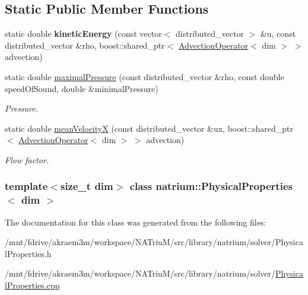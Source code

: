 \subsection*{Static Public Member Functions}
\begin{DoxyCompactItemize}
\item 
\hypertarget{classnatrium_1_1PhysicalProperties_a153e1a29848b78871687c2399f6a12f0}{
static double {\bfseries kineticEnergy} (const vector$<$ distributed\_\-vector $>$ \&u, const distributed\_\-vector \&rho, boost::shared\_\-ptr$<$ \hyperlink{classnatrium_1_1AdvectionOperator}{AdvectionOperator}$<$ dim $>$ $>$ advection)}
\label{classnatrium_1_1PhysicalProperties_a153e1a29848b78871687c2399f6a12f0}

\item 
\hypertarget{classnatrium_1_1PhysicalProperties_a9041e6fc4bebe07da63c6f0b25aabc0d}{
static double \hyperlink{classnatrium_1_1PhysicalProperties_a9041e6fc4bebe07da63c6f0b25aabc0d}{maximalPressure} (const distributed\_\-vector \&rho, const double speedOfSound, double \&minimalPressure)}
\label{classnatrium_1_1PhysicalProperties_a9041e6fc4bebe07da63c6f0b25aabc0d}

\begin{DoxyCompactList}\small\item\em Pressure. \item\end{DoxyCompactList}\item 
\hypertarget{classnatrium_1_1PhysicalProperties_a2b4446026df3dc765c81ef4f9ae7ed78}{
static double \hyperlink{classnatrium_1_1PhysicalProperties_a2b4446026df3dc765c81ef4f9ae7ed78}{meanVelocityX} (const distributed\_\-vector \&ux, boost::shared\_\-ptr$<$ \hyperlink{classnatrium_1_1AdvectionOperator}{AdvectionOperator}$<$ dim $>$ $>$ advection)}
\label{classnatrium_1_1PhysicalProperties_a2b4446026df3dc765c81ef4f9ae7ed78}

\begin{DoxyCompactList}\small\item\em Flow factor. \item\end{DoxyCompactList}\end{DoxyCompactItemize}
\subsubsection*{template$<$size\_\-t dim$>$ class natrium::PhysicalProperties$<$ dim $>$}



The documentation for this class was generated from the following files:\begin{DoxyCompactItemize}
\item 
/mnt/fdrive/akraem3m/workspace/NATriuM/src/library/natrium/solver/PhysicalProperties.h\item 
/mnt/fdrive/akraem3m/workspace/NATriuM/src/library/natrium/solver/\hyperlink{PhysicalProperties_8cpp}{PhysicalProperties.cpp}\end{DoxyCompactItemize}
